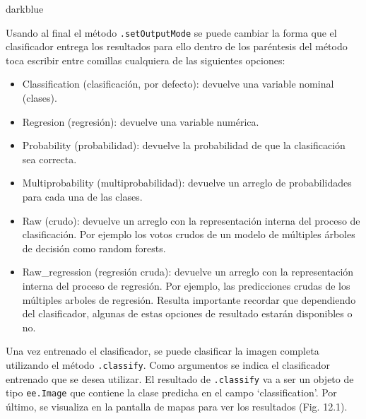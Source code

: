\documentclass[
  12pt,
  letterpaper,
  twoside]{book}
\providecommand{\tightlist}{%
  \setlength{\itemsep}{0pt}\setlength{\parskip}{0pt}}
\begin{document}
\begin{bluebox2}

\begin{awesomeblock}{5pt}{\faLightbulb}{darkblue}

Usando al final el método \texttt{.setOutputMode} se puede cambiar la forma que el clasificador entrega los resultados para ello dentro de los paréntesis del método toca escribir entre comillas cualquiera de las siguientes opciones:

\begin{itemize}
\tightlist
\item
  Classification (clasificación, por defecto): devuelve una variable nominal (clases).
\item
  Regresion (regresión): devuelve una variable numérica.
\item
  Probability (probabilidad): devuelve la probabilidad de que la clasificación sea correcta.
\item
  Multiprobability (multiprobabilidad): devuelve un arreglo de probabilidades para cada una de las clases.
\item
  Raw (crudo): devuelve un arreglo con la representación interna del proceso de clasificación. Por ejemplo los votos crudos de un modelo de múltiples árboles de decisión como random forests.
\item
  Raw\_regression (regresión cruda): devuelve un arreglo con la representación interna del proceso de regresión. Por ejemplo, las predicciones crudas de los múltiples arboles de regresión.
  Resulta importante recordar que dependiendo del clasificador, algunas de estas opciones de resultado estarán disponibles o no.
\end{itemize}

\end{awesomeblock}

\end{bluebox2}

Una vez entrenado el clasificador, se puede clasificar la imagen completa utilizando el método \texttt{.classify}. Como argumentos se indica el clasificador entrenado que se desea utilizar. El resultado de \texttt{.classify} va a ser un objeto de tipo \texttt{ee.Image} que contiene la clase predicha en el campo `classification'. Por último, se visualiza en la pantalla de mapas para ver los resultados (Fig. 12.1).
\end{document}
